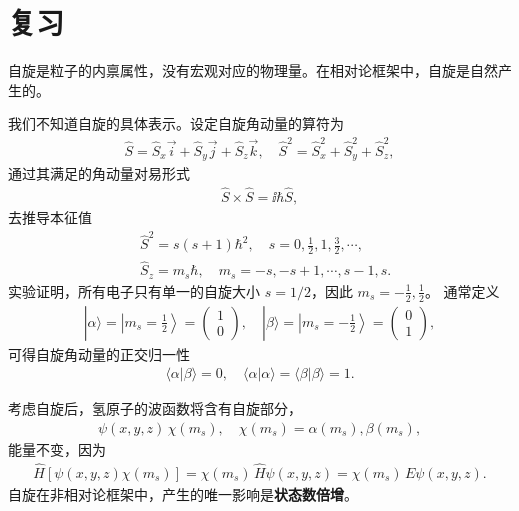 \section{复习}
自旋是粒子的内禀属性，没有宏观对应的物理量。在相对论框架中，自旋是自然产生的。

我们不知道自旋的具体表示。设定自旋角动量的算符为
\begin{align}
    \hat S = \hat S_x \vec i + \hat S_y \vec j + \hat S_z \vec k, 
    \quad 
    \hat S^2 = \hat S_x^2 + \hat S_y ^2 + \hat S_z^2,
\end{align}
通过其满足的角动量对易形式
\begin{align}
    \hat S \times \hat S = \ii \hbar \hat S,
\end{align}
去推导本征值
\begin{align}
    &\hat S^2 = s(s+1)\hbar^2, \quad s = 0, \frac12, 1, \frac32, \cdots, \\
    &\hat S_z = m_s \hbar, \quad m_s = -s, -s+1, \cdots, s-1, s. 
\end{align}
实验证明，所有电子只有单一的自旋大小 $s=1/2$，因此 $m_s = -\frac12, \frac12$。
通常定义
\begin{align}
    |\alpha\rangle = \left|m_s = \frac12 \right\rangle = \begin{pmatrix}
        1\\0
    \end{pmatrix},
    \quad 
    |\beta\rangle = \left|m_s = -\frac12 \right\rangle = \begin{pmatrix}
        0 \\ 1
    \end{pmatrix},
\end{align}
可得自旋角动量的正交归一性
\begin{align}
    \langle\alpha | \beta \rangle = 0, \quad
    \langle \alpha | \alpha \rangle = \langle \beta | \beta \rangle = 1. 
\end{align}

考虑自旋后，氢原子的波函数将含有自旋部分，
\begin{align}
    \psi(x,y,z) \, \chi(m_s), \quad \chi(m_s) = \alpha(m_s), \beta(m_s),
\end{align}
能量不变，因为
\begin{align}
    \hat H[\psi(x,y,z) \chi(m_s)] = \chi(m_s) \, \hat H \psi(x,y,z) = \chi(m_s) \, E \psi(x,y,z). 
\end{align}
自旋在非相对论框架中，产生的唯一影响是\textbf{状态数倍增}。


